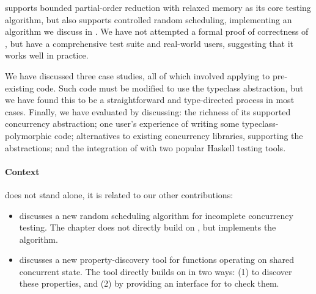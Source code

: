 \dejafu{} supports bounded partial-order reduction\cite{coons2013}
with relaxed memory\cite{zhang2015} as its core testing algorithm, but
also supports controlled random scheduling, implementing an algorithm
we discuss in .  We have not attempted a formal
proof of correctness of \dejafu{}, but have a comprehensive test suite
and real-world users, suggesting that it works well in practice.

We have discussed three case studies, all of which involved applying
\dejafu{} to pre-existing code.  Such code must be modified to use the
\dejafu{} typeclass abstraction, but we have found this to be a
straightforward and type-directed process in most cases.  Finally, we
have evaluated \dejafu{} by discussing: the richness of its supported
concurrency abstraction; one user's experience of writing some
typeclass-polymorphic code; alternatives to existing concurrency
libraries, supporting the \dejafu{} abstractions; and the integration
of \dejafu{} with two popular Haskell testing tools.

\paragraph{Context}
\dejafu{} does not stand alone, it is related to our other
contributions:

\begin{itemize}
\item {} discusses a new random scheduling
  algorithm for incomplete concurrency testing.  The chapter does not
  directly build on \dejafu{}, but \dejafu{} implements the algorithm.
\item {} discusses a new property-discovery tool for
  functions operating on shared concurrent state.  The tool directly
  builds on \dejafu{} in two ways: (1) to discover these properties,
  and (2) by providing an interface for \dejafu{} to check them.
\end{itemize}
